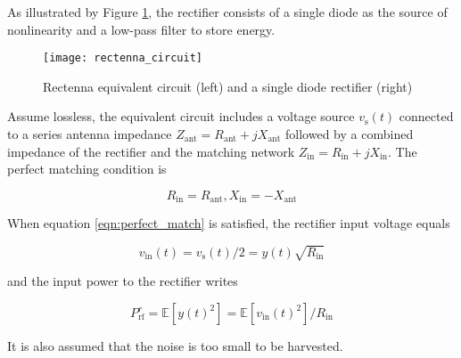 As illustrated by Figure \ref{fig:rectenna_circuit}, the rectifier consists of a single diode as the source of nonlinearity and a low-pass filter to store energy.

\begin{figure}
  \centering
    \texttt{[image: rectenna\_circuit]}
  \caption{Rectenna equivalent circuit (left) and a single diode rectifier (right) \cite{Clerckx2018a}}
  \label{fig:rectenna_circuit}
\end{figure} 

Assume lossless, the equivalent circuit includes a voltage source ${v_{\text{s}}}(t)$ connected to a series antenna impedance ${Z_{{\text{ant}}}} = {R_{{\text{ant}}}} + j{X_{{\text{ant}}}}$ followed by a combined impedance of the rectifier and the matching network ${Z_{{\text{in}}}} = {R_{{\text{in}}}} + j{X_{{\text{in}}}}$. The perfect matching condition is

\begin{equation}\label{eqn:perfect_match}
  {R_{{\text{in}}}} = {R_{{\text{ant}}}},{X_{{\text{in}}}} =  - {X_{{\text{ant}}}}
\end{equation}

When equation \ref{eqn:perfect_match} is satisfied, the rectifier input voltage equals 

\begin{equation}\label{eqn:rectifier_input_voltage}
  {v_{{\text{in}}}}(t) = {v_{\text{s}}}(t)/2 = y(t)\sqrt {{R_{{\text{in}}}}} 
\end{equation}

and the input power to the rectifier writes 

\begin{equation}\label{eqn:rectifier_input_power}
  P_{{\text{rf}}}^r = \mathbb{E}\left[ {y{{(t)}^2}} \right] = \mathbb{E}\left[ {{v_{{\text{in}}}}{{(t)}^2}} \right]/{R_{{\text{in}}}}
\end{equation}

It is also assumed that the noise is too small to be harvested.
